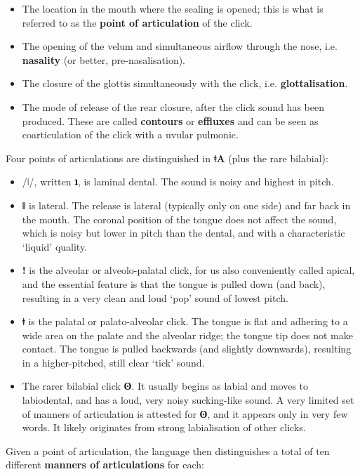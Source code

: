 \documentclass[11pt,a5paper]{book}
\newcommand{\qcn}[1]{\textcolor{AccentText}{\large\textbf{#1}}}
\newcommand{\langname}{\qcn{ǂA}}
\begin{document}
\begin{itemize}
	\item The location in the mouth where the sealing is opened; this is what is referred to as the \textbf{point of articulation} of the click.
	\item The opening of the velum and simultaneous airflow through the nose, i.e. \textbf{nasality} (or better, pre-nasalisation).
	\item The closure of the glottis simultaneously with the click, i.e. \textbf{glottalisation}.
	\item The mode of release of the rear closure, after the click sound has been produced. These are called \textbf{contours} or \textbf{effluxes} and can be seen as coarticulation of the click with a uvular pulmonic.
\end{itemize}

Four points of articulations are distinguished in \langname{} (plus the rare bilabial):

\begin{itemize}
	\item  /ǀ/, written \qcn{ʇ}, is laminal dental. The sound is noisy and highest in pitch.
	\item \qcn{ǁ} is lateral. The release is lateral (typically only on one side) and far back in the mouth. The coronal position of the tongue does not affect the sound, which is noisy but lower in pitch than the dental, and with a characteristic `liquid' quality.
	\item \qcn{!} is the alveolar or alveolo-palatal click, for us also conveniently called apical, and the essential feature is that the tongue is pulled down (and back), resulting in a very clean and loud `pop' sound of lowest pitch.
	 \item \qcn{ǂ} is the palatal or palato-alveolar click. The tongue is flat and adhering to a wide area on the palate and the alveolar ridge; the tongue tip does not make contact. The tongue is pulled backwards (and slightly downwards), resulting in a higher-pitched, still clear `tick' sound.
	\item The rarer bilabial click \qcn{ʘ}. It usually begins as labial and moves to labiodental, and has a loud, very noisy sucking-like sound. A very limited set of manners of articulation is attested for \qcn{ʘ}, and it appears only in very few words. It likely originates from strong labialisation of other clicks.
\end{itemize}

Given a point of articulation, the language then distinguishes a total of ten different \textbf{manners of articulations} for each:
\end{document}
